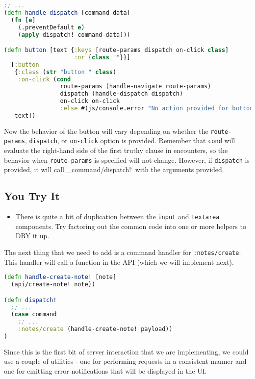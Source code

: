 \documentclass[10pt,twoside,openright]{memoir}
\begin{document}
\begin{lstlisting}[language=Clojure, caption={notes/ui/common.cljs}]
;; ...
(defn handle-dispatch [command-data]
  (fn [e]
    (.preventDefault e)
    (apply dispatch! command-data)))

(defn button [text {:keys [route-params dispatch on-click class]
                    :or {class ""}}]
  [:button
   {:class (str "button " class)
    :on-click (cond
                route-params (handle-navigate route-params)
                dispatch (handle-dispatch dispatch)
                on-click on-click
                :else #(js/console.error "No action provided for button"))}
   text])
\end{lstlisting}

Now the behavior of the button will vary depending on whether the
\texttt{route-params}, \texttt{dispatch}, or \texttt{on-click} option is
provided. Remember that \texttt{cond} will evaluate the right-hand side
of the first truthy clause in encounters, so the behavior when
\texttt{route-params} is specified will not change. However, if
\texttt{dispatch} is provided, it will call \_command/dispatch!` with
the arguments provided.


\subsection{You Try It}

\begin{itemize}
\tightlist
\item
There is quite a bit of duplication between the \texttt{input} and
\texttt{textarea} components. Try factoring out the common code into one
or more helpers to DRY it up.
\end{itemize}

The next thing that we need to add is a command handler for
\texttt{:notes/create}. This handler will call a function in the API
(which we will implement next).

\begin{lstlisting}[language=Clojure]
(defn handle-create-note! [note]
  (api/create-note! note))

(defn dispatch!
  ;; ...
  (case command
    ;; ...
    :notes/create (handle-create-note! payload))
)
\end{lstlisting}

Since this is the first bit of server interaction that we are
implementing, we could use a couple of utilities - one for performing
requests in a consistent manner and one for emitting error notifications
that will be displayed in the UI.
\end{document}
